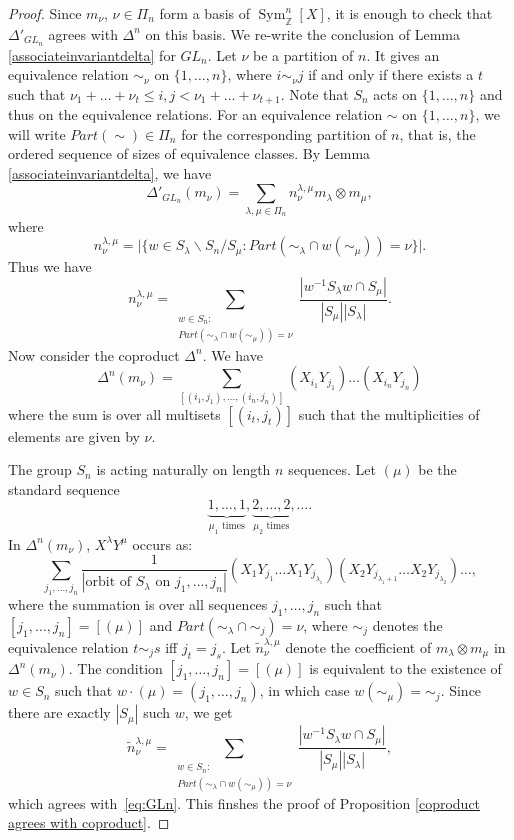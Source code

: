 \documentclass{amsart}
\theoremstyle{plain}
\theoremstyle{definition}
\theoremstyle{remark}
\DeclareMathOperator{\Sym}{Sym}
\begin{document}
\begin{proof}
Since $m_{\nu}$, $\nu\in\Pi_{n}$ form a basis of $\Sym_{\mathbb{Z}}^{n}[X]$, it is enough to check that $\Delta'_{GL_{n}}$ agrees with $\Delta^{n}$ on this basis.
We re-write the conclusion of Lemma \ref{associateinvariantdelta} for $GL_n$. Let $\nu$ be a partition of $n$. It gives an equivalence relation $\sim_\nu$ on $\{1,\ldots,n\}$, where $i\sim_\nu j$ if and only if there exists a $t$ such that $\nu_1+\ldots+\nu_t\leq i,j<\nu_1+\ldots+\nu_{t+1}$. Note that $S_n$ acts on $\{1,\ldots,n\}$ and thus on the equivalence relations. For an equivalence relation $\sim$ on $\{1,\ldots,n\}$, we will write $Part(\sim)\in\Pi_n$ for the corresponding partition of $n$, that is, the ordered sequence of sizes of equivalence classes. 
By Lemma \ref{associateinvariantdelta}, we have
\[
    \Delta'_{GL_{n}}(m_\nu)=\sum_{\lambda,\mu\in\Pi_{n}}n_{\nu}^{\lambda,\mu}m_\lambda\otimes m_\mu,
\]
where 
\[
n_{\nu}^{\lambda,\mu}=\big|\{w\in S_{\lambda}\backslash S_{n}/S_{\mu}:Part(\sim_{\lambda}\cap w(\sim_{\mu}))=\nu\}\big|.
\]
Thus we have
\begin{equation}\label{eq:GLn}
  n_\nu^{\lambda,\mu}
  =
  \sum_{\substack{w\in S_n\colon
  \\
  Part(\sim_\lambda\cap w(\sim_\mu))=\nu}}\frac{|w^{-1}S_{\lambda}w\cap S_{\mu}|}{|S_\mu||S_\lambda|}.
\end{equation}
Now consider the coproduct $\Delta^n$.
We have
\[
    \Delta^{n}(m_\nu)=\sum_{[(i_1,j_1),\ldots,(i_n,j_n)]}(X_{i_1}Y_{j_1})\ldots(X_{i_n}Y_{j_n})
\]
where the sum is over all multisets $[(i_t,j_t)]$ such that the multiplicities of elements are given by $\nu$.

The group $S_n$ is acting naturally on length $n$ sequences. Let $(\mu)$ be the standard sequence
\[
    \underbrace{1,\ldots,1}_{\mu_1\text{ times}},\underbrace{2,\ldots,2}_{\mu_2\text{ times}},\ldots.
\]
In $\Delta^{n}(m_{\nu})$, $X^\lambda Y^\mu$ occurs as:
\[
    \sum_{j_1,\ldots,j_n}\frac{1}{|\text{orbit of }S_\lambda\text{ on }j_{1},\ldots,j_{n}|}(X_1Y_{j_1}\ldots X_1Y_{j_{\lambda_1}})(X_2Y_{j_{\lambda_1+1}}\ldots X_2Y_{j_{\lambda_2}})\ldots,
\]
where the summation is over all sequences $j_1,\ldots,j_n$ such that $[j_{1},\ldots,j_{n}]=[(\mu)]$ and $Part(\sim_\lambda\cap\sim_j)=\nu$, where $\sim_j$ denotes the equivalence relation $t\sim_j s$ iff $j_t=j_s$.
Let $\widetilde{n}_{\nu}^{\lambda,\mu}$ denote the coefficient of $m_{\lambda}\otimes m_{\mu}$ in $\Delta^{n}(m_{\nu})$.
The condition $[j_1,\ldots,j_n]=[(\mu)]$ is equivalent to the existence of $w\in S_n$ such that $w\cdot(\mu)=(j_1,\ldots,j_n)$, in which case $w(\sim_\mu)=\sim_j$. Since there are exactly $|S_\mu|$ such $w$, we get
\[
\widetilde{n}_\nu^{\lambda,\mu}
  =
  \sum_{\substack{w\in S_n\colon
  \\
  Part(\sim_\lambda\cap w(\sim_\mu))=\nu}}\frac{|w^{-1}S_{\lambda}w\cap S_{\mu}|}{|S_\mu||S_\lambda|},
\]
which agrees with~\eqref{eq:GLn}.
This finshes the proof of Proposition \ref{coproduct agrees with coproduct}.
\end{proof}
\end{document}

